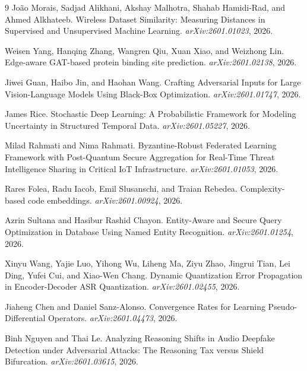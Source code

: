 \documentclass[11pt]{article}
\begin{document}
\begin{thebibliography}{9}
João Morais, Sadjad Alikhani, Akshay Malhotra, Shahab Hamidi-Rad, and Ahmed Alkhateeb. Wireless Dataset Similarity: Measuring Distances in Supervised and Unsupervised Machine Learning. \emph{arXiv:2601.01023}, 2026.

Weisen Yang, Hanqing Zhang, Wangren Qiu, Xuan Xiao, and Weizhong Lin. Edge-aware GAT-based protein binding site prediction. \emph{arXiv:2601.02138}, 2026.

Jiwei Guan, Haibo Jin, and Haohan Wang. Crafting Adversarial Inputs for Large Vision-Language Models Using Black-Box Optimization. \emph{arXiv:2601.01747}, 2026.

James Rice. Stochastic Deep Learning: A Probabilistic Framework for Modeling Uncertainty in Structured Temporal Data. \emph{arXiv:2601.05227}, 2026.

Milad Rahmati and Nima Rahmati. Byzantine-Robust Federated Learning Framework with Post-Quantum Secure Aggregation for Real-Time Threat Intelligence Sharing in Critical IoT Infrastructure. \emph{arXiv:2601.01053}, 2026.

Rares Folea, Radu Iacob, Emil Slusanschi, and Traian Rebedea. Complexity-based code embeddings. \emph{arXiv:2601.00924}, 2026.

Azrin Sultana and Hasibur Rashid Chayon. Entity-Aware and Secure Query Optimization in Database Using Named Entity Recognition. \emph{arXiv:2601.01254}, 2026.

Xinyu Wang, Yajie Luo, Yihong Wu, Liheng Ma, Ziyu Zhao, Jingrui Tian, Lei Ding, Yufei Cui, and Xiao-Wen Chang. Dynamic Quantization Error Propagation in Encoder-Decoder ASR Quantization. \emph{arXiv:2601.02455}, 2026.

Jiaheng Chen and Daniel Sanz-Alonso. Convergence Rates for Learning Pseudo-Differential Operators. \emph{arXiv:2601.04473}, 2026.

Binh Nguyen and Thai Le. Analyzing Reasoning Shifts in Audio Deepfake Detection under Adversarial Attacks: The Reasoning Tax versus Shield Bifurcation. \emph{arXiv:2601.03615}, 2026.


\end{thebibliography}
\end{document}

